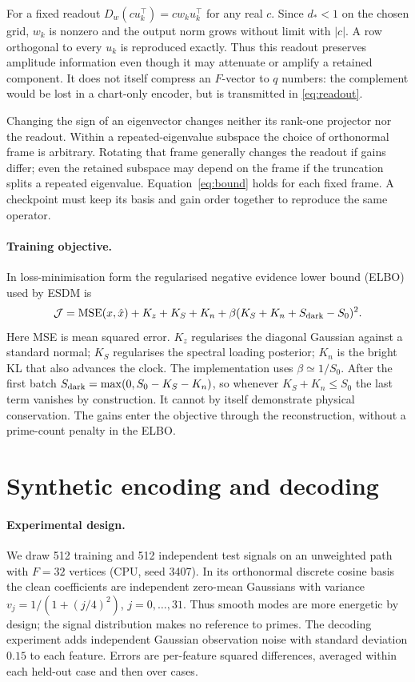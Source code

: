\documentclass[11pt,a4paper]{article}
\begin{document}
For a fixed readout $D_w(cu_k^\top)=cw_k u_k^\top$ for any real $c$.
Since $d_*<1$ on the chosen grid, $w_k$ is nonzero and the output norm grows
without limit with $|c|$. A row orthogonal to every $u_k$ is reproduced
exactly. Thus this readout preserves amplitude information even though it
may attenuate or amplify a retained component. It does not itself compress
an $F$-vector to $q$ numbers: the complement would be lost in a chart-only
encoder, but is transmitted in \eqref{eq:readout}.

Changing the sign of an eigenvector changes neither its rank-one projector
nor the readout. Within a repeated-eigenvalue subspace the choice of
orthonormal frame is arbitrary. Rotating that frame generally changes the
readout if gains differ; even the retained subspace may depend on the frame
if the truncation splits a repeated eigenvalue. Equation~\eqref{eq:bound}
holds for each fixed frame. A checkpoint must keep its basis and gain order
together to reproduce the same operator.

\paragraph{Training objective.}
In loss-minimisation form the regularised negative evidence lower bound
(ELBO) used by ESDM is
\begin{equation}
 \mathcal J=\operatorname{MSE}(x,\hat x)+K_z+K_S+K_n+
      \beta(K_S+K_n+S_{\rm dark}-S_0)^2 .
\end{equation}
Here MSE is mean squared error. $K_z$ regularises the diagonal Gaussian
against a standard normal; $K_S$
regularises the spectral loading posterior; $K_n$ is the bright KL that
also advances the clock. The implementation uses $\beta\simeq1/S_0$.
After the first batch $S_{\rm dark}=\max(0,S_0-K_S-K_n)$, so whenever
$K_S+K_n\le S_0$ the last term vanishes by construction. It cannot by
itself demonstrate physical conservation. The gains enter the objective
through the reconstruction, without a prime-count penalty in the ELBO.

\section{Synthetic encoding and decoding}
\paragraph{Experimental design.}
We draw 512 training and 512 independent test signals on an unweighted path
with $F=32$ vertices (CPU, seed 3407). In its orthonormal discrete cosine
basis the clean coefficients are independent zero-mean Gaussians with
variance $v_j=1/(1+(j/4)^2)$, $j=0,\ldots,31$. Thus smooth modes are more
energetic by design; the signal distribution makes no reference to primes.
The decoding experiment adds independent Gaussian observation noise with
standard deviation $0.15$ to each feature. Errors are per-feature squared
differences, averaged within each held-out case and then over cases.
\end{document}
